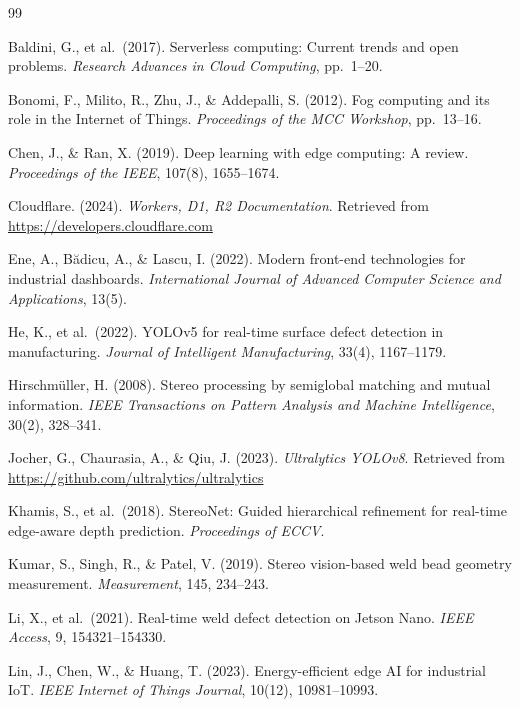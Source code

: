 \documentclass[12pt,a4paper]{article}
\begin{document}
\begin{thebibliography}{99}

Baldini, G., et al.\ (2017). Serverless computing: Current trends and open problems.
\textit{Research Advances in Cloud Computing}, pp.\ 1--20.

Bonomi, F., Milito, R., Zhu, J., \& Addepalli, S. (2012). Fog computing and its role in the Internet of
Things. \textit{Proceedings of the MCC Workshop}, pp.\ 13--16.

Chen, J., \& Ran, X. (2019). Deep learning with edge computing: A review.
\textit{Proceedings of the IEEE}, 107(8), 1655--1674.

Cloudflare. (2024). \textit{Workers, D1, R2 Documentation}.
Retrieved from \url{https://developers.cloudflare.com}

Ene, A., B\u{a}dicu, A., \& Lascu, I. (2022). Modern front-end technologies for industrial dashboards.
\textit{International Journal of Advanced Computer Science and Applications}, 13(5).

He, K., et al.\ (2022). YOLOv5 for real-time surface defect detection in manufacturing.
\textit{Journal of Intelligent Manufacturing}, 33(4), 1167--1179.

Hirschm\"uller, H. (2008). Stereo processing by semiglobal matching and mutual information.
\textit{IEEE Transactions on Pattern Analysis and Machine Intelligence}, 30(2), 328--341.

Jocher, G., Chaurasia, A., \& Qiu, J. (2023). \textit{Ultralytics YOLOv8}.
Retrieved from \url{https://github.com/ultralytics/ultralytics}

Khamis, S., et al.\ (2018). StereoNet: Guided hierarchical refinement for real-time edge-aware depth
prediction. \textit{Proceedings of ECCV}.

Kumar, S., Singh, R., \& Patel, V. (2019). Stereo vision-based weld bead geometry measurement.
\textit{Measurement}, 145, 234--243.

Li, X., et al.\ (2021). Real-time weld defect detection on Jetson Nano.
\textit{IEEE Access}, 9, 154321--154330.

Lin, J., Chen, W., \& Huang, T. (2023). Energy-efficient edge AI for industrial IoT.
\textit{IEEE Internet of Things Journal}, 10(12), 10981--10993.


\end{thebibliography}
\end{document}
